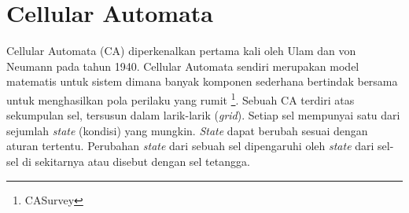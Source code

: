 





\section{Cellular Automata}
\label{sec:cellularautomata}

Cellular Automata (CA) diperkenalkan pertama kali oleh Ulam dan von Neumann pada tahun 1940. Cellular Automata sendiri merupakan model matematis untuk sistem dimana banyak komponen sederhana bertindak bersama untuk menghasilkan pola perilaku yang rumit \footnote{CASurvey}. Sebuah CA terdiri atas sekumpulan sel, tersusun dalam larik-larik (\textit{grid}). Setiap sel mempunyai satu dari sejumlah \textit{state} (kondisi) yang mungkin. \textit{State} dapat berubah sesuai dengan aturan tertentu. Perubahan \textit{state} dari sebuah sel dipengaruhi oleh \textit{state} dari sel-sel di sekitarnya atau disebut dengan sel tetangga.


